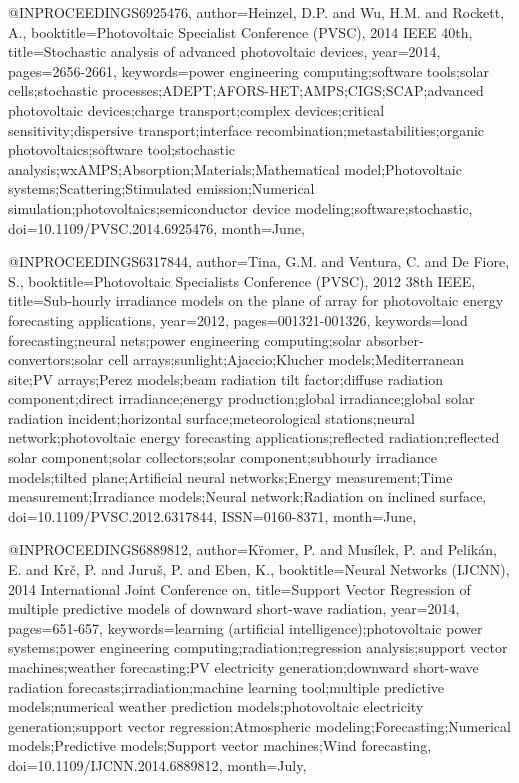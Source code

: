 {@INPROCEEDINGS{6925476, 
author={Heinzel, D.P. and Wu, H.M. and Rockett, A.}, 
booktitle={Photovoltaic Specialist Conference (PVSC), 2014 IEEE 40th}, 
title={Stochastic analysis of advanced photovoltaic devices}, 
year={2014}, 
pages={2656-2661}, 
keywords={power engineering computing;software tools;solar cells;stochastic processes;ADEPT;AFORS-HET;AMPS;CIGS;SCAP;advanced photovoltaic devices;charge transport;complex devices;critical sensitivity;dispersive transport;interface recombination;metastabilities;organic photovoltaics;software tool;stochastic analysis;wxAMPS;Absorption;Materials;Mathematical model;Photovoltaic systems;Scattering;Stimulated emission;Numerical simulation;photovoltaics;semiconductor device modeling;software;stochastic}, 
doi={10.1109/PVSC.2014.6925476}, 
month={June},}

@INPROCEEDINGS{6317844, 
author={Tina, G.M. and Ventura, C. and De Fiore, S.}, 
booktitle={Photovoltaic Specialists Conference (PVSC), 2012 38th IEEE}, 
title={Sub-hourly irradiance models on the plane of array for photovoltaic energy forecasting applications}, 
year={2012}, 
pages={001321-001326}, 
keywords={load forecasting;neural nets;power engineering computing;solar absorber-convertors;solar cell arrays;sunlight;Ajaccio;Klucher models;Mediterranean site;PV arrays;Perez models;beam radiation tilt factor;diffuse radiation component;direct irradiance;energy production;global irradiance;global solar radiation incident;horizontal surface;meteorological stations;neural network;photovoltaic energy forecasting applications;reflected radiation;reflected solar component;solar collectors;solar component;subhourly irradiance models;tilted plane;Artificial neural networks;Energy measurement;Time measurement;Irradiance models;Neural network;Radiation on inclined surface}, 
doi={10.1109/PVSC.2012.6317844}, 
ISSN={0160-8371}, 
month={June},}

@INPROCEEDINGS{6889812, 
author={Kr̈omer, P. and Musílek, P. and Pelikán, E. and Krč, P. and Juruš, P. and Eben, K.}, 
booktitle={Neural Networks (IJCNN), 2014 International Joint Conference on}, 
title={Support Vector Regression of multiple predictive models of downward short-wave radiation}, 
year={2014}, 
pages={651-657}, 
keywords={learning (artificial intelligence);photovoltaic power systems;power engineering computing;radiation;regression analysis;support vector machines;weather forecasting;PV electricity generation;downward short-wave radiation forecasts;irradiation;machine learning tool;multiple predictive models;numerical weather prediction models;photovoltaic electricity generation;support vector regression;Atmospheric modeling;Forecasting;Numerical models;Predictive models;Support vector machines;Wind forecasting}, 
doi={10.1109/IJCNN.2014.6889812}, 
month={July},}

}
